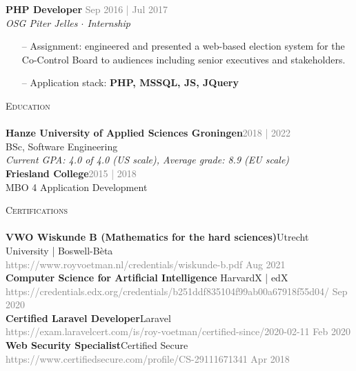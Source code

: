 \documentclass[a4paper]{article}
\newcommand{\lineunder} {
    \vspace*{-8pt} \\
    \hspace*{-18pt} \hrulefill \\
}
\newcommand{\header} [1] {
    {\hspace*{-18pt}\vspace*{6pt} \textsc{#1}}
    \vspace*{-6pt} \lineunder
}
\begin{document}
\textbf{PHP Developer} \hfill \textcolor{gray}{Sep 2016 | Jul 2017}\\
\textit{OSG Piter Jelles $\cdot$ Internship}\\
\vspace{-1mm}
\begin{itemize} \itemsep 1pt
	\item[--] Assignment: engineered and presented a web-based election system for the Co-Control Board to audiences including senior executives and stakeholders.
	\item[--] Application stack: \textbf{PHP, MSSQL, JS, JQuery}
\end{itemize}


\vspace{5mm}

\header{Education}
\vspace{2mm}
\textbf{Hanze University of Applied Sciences Groningen}\hfill \textcolor{gray}{2018 | 2022}\\
BSc, Software Engineering\\
\vspace{1mm}
\emph{Current GPA: 4.0 of 4.0 (US scale), Average grade: 8.9 (EU scale)}\\
\vspace{4mm}
\textbf{Friesland College}\hfill \textcolor{gray}{2015 | 2018}\\
MBO 4 Application Development\\

\newpage

\header{Certifications}
\textbf{VWO Wiskunde B (Mathematics for the hard sciences)}\hfill Utrecht University | Boswell-Bèta\\
 \textcolor{gray}{https://www.royvoetman.nl/credentials/wiskunde-b.pdf}
 \hfill \textcolor{gray}{Aug 2021}\\
\vspace{2mm}
\textbf{Computer Science for Artificial Intelligence }\hfill HarvardX | edX\\
\textcolor{gray}{https://credentials.edx.org/credentials/b251ddf835104f99ab00a67918f55d04/} \hfill \textcolor{gray}{Sep 2020}\\
\vspace{2mm}
\textbf{Certified Laravel Developer}\hfill Laravel\\
\textcolor{gray}{https://exam.laravelcert.com/is/roy-voetman/certified-since/2020-02-11} \hfill \textcolor{gray}{Feb 2020}\\
\vspace{2mm}
\textbf{Web Security Specialist}\hfill Certified Secure\\
\textcolor{gray}{https://www.certifiedsecure.com/profile/CS-29111671341} \hfill \textcolor{gray}{Apr 2018}\\
\vspace{2mm}
\end{document}

